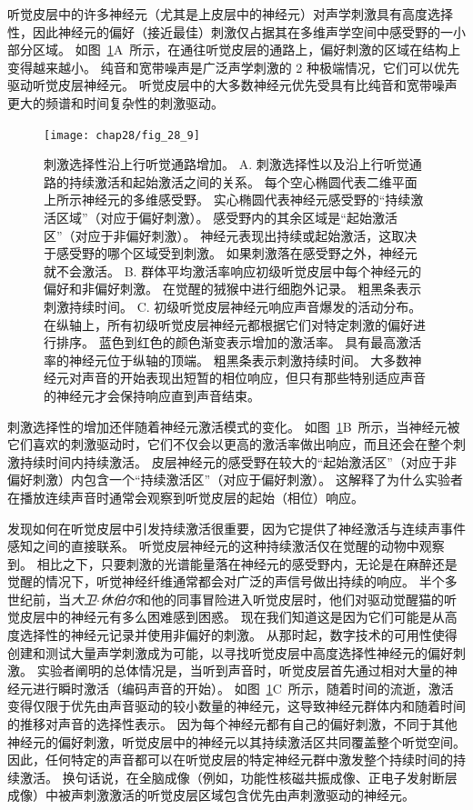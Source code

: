 听觉皮层中的许多神经元（尤其是上皮层中的神经元）对声学刺激具有高度选择性，因此神经元的偏好（接近最佳）刺激仅占据其在多维声学空间中感受野的一小部分区域。
如图~\ref{fig:28_9}A~所示，在通往听觉皮层的通路上，偏好刺激的区域在结构上变得越来越小。
纯音和宽带噪声是广泛声学刺激的 2 种极端情况，它们可以优先驱动听觉皮层神经元。
听觉皮层中的大多数神经元优先受具有比纯音和宽带噪声更大的频谱和时间复杂性的刺激驱动。


\begin{figure}[htbp]
	\centering
	\texttt{[image: chap28/fig\_28\_9]}
	\caption{刺激选择性沿上行听觉通路增加。
		A. 刺激选择性以及沿上行听觉通路的持续激活和起始激活之间的关系。
		每个空心椭圆代表二维平面上所示神经元的多维感受野。
		实心椭圆代表神经元感受野的“持续激活区域”（对应于偏好刺激）。
		感受野内的其余区域是“起始激活区”（对应于非偏好刺激）。
		神经元表现出持续或起始激活，这取决于感受野的哪个区域受到刺激。
		如果刺激落在感受野之外，神经元就不会激活\cite{wang2018cortical}。
		B. 群体平均激活率响应初级听觉皮层中每个神经元的偏好和非偏好刺激。
		在觉醒的狨猴中进行细胞外记录。
		粗黑条表示刺激持续时间\cite{wang2005sustained}。
		C. 初级听觉皮层神经元响应声音爆发的活动分布。
		在纵轴上，所有初级听觉皮层神经元都根据它们对特定刺激的偏好进行排序。
		蓝色到红色的颜色渐变表示增加的激活率。
		具有最高激活率的神经元位于纵轴的顶端。
		粗黑条表示刺激持续时间。
		大多数神经元对声音的开始表现出短暂的相位响应，但只有那些特别适应声音的神经元才会保持响应直到声音结束\cite{middlebrooks2005auditory}。 }
	\label{fig:28_9}
\end{figure}


刺激选择性的增加还伴随着神经元激活模式的变化。
如图~\ref{fig:28_9}B~所示，当神经元被它们喜欢的刺激驱动时，它们不仅会以更高的激活率做出响应，而且还会在整个刺激持续时间内持续激活。
皮层神经元的感受野在较大的“起始激活区”（对应于非偏好刺激）内包含一个“持续激活区”（对应于偏好刺激）。 
这解释了为什么实验者在播放连续声音时通常会观察到听觉皮层的起始（相位）响应。


发现如何在听觉皮层中引发持续激活很重要，因为它提供了神经激活与连续声事件感知之间的直接联系。
听觉皮层神经元的这种持续激活仅在觉醒的动物中观察到。
相比之下，只要刺激的光谱能量落在神经元的感受野内，无论是在麻醉还是觉醒的情况下，听觉神经纤维通常都会对广泛的声信号做出持续的响应。
半个多世纪前，当\textit{大卫$\cdot$休伯尔}和他的同事冒险进入听觉皮层时，他们对驱动觉醒猫的听觉皮层中的神经元有多么困难感到困惑。
现在我们知道这是因为它们可能是从高度选择性的神经元记录并使用非偏好的刺激。
从那时起，数字技术的可用性使得创建和测试大量声学刺激成为可能，以寻找听觉皮层中高度选择性神经元的偏好刺激。
实验者阐明的总体情况是，当听到声音时，听觉皮层首先通过相对大量的神经元进行瞬时激活（编码声音的开始）。
如图~\ref{fig:28_9}C~所示，随着时间的流逝，激活变得仅限于优先由声音驱动的较小数量的神经元，这导致神经元群体内和随着时间的推移对声音的选择性表示。
因为每个神经元都有自己的偏好刺激，不同于其他神经元的偏好刺激，听觉皮层中的神经元以其持续激活区共同覆盖整个听觉空间。
因此，任何特定的声音都可以在听觉皮层的特定神经元群中激发整个持续时间的持续激活。
换句话说，在全脑成像（例如，功能性核磁共振成像、正电子发射断层成像）中被声刺激激活的听觉皮层区域包含优先由声刺激驱动的神经元。



